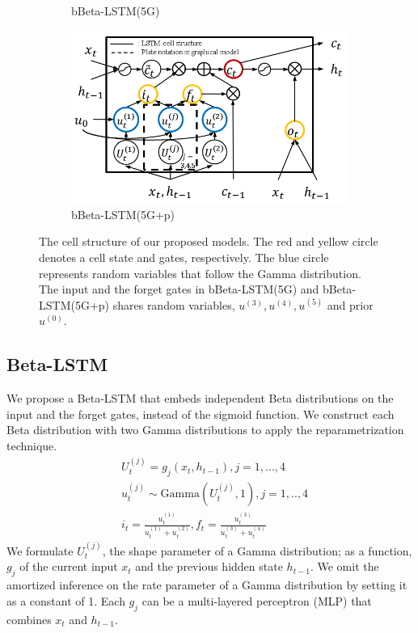 \documentclass[letterpaper]{article} %
\begin{document}
\begin{figure}[t!]
\begin{subfigure}{.48\columnwidth}
		\caption{bBeta-LSTM(5G)} 
	\end{subfigure}\hfil
	\begin{subfigure}{.48\columnwidth}
		\centering
		\includegraphics[width=\linewidth]{bBLSTM_5G_prior_cell.png}
		\caption{bBeta-LSTM(5G+p)}
		\label{fig:bBLSTM(5G)_prior_cell}
	\end{subfigure}
	\caption{The cell structure of our proposed models. The red and yellow circle denotes a cell state and gates, respectively. The blue circle represents random variables that follow the Gamma distribution. The input and the forget gates in bBeta-LSTM(5G) and bBeta-LSTM(5G+p) shares random variables, $u^{(3)},u^{(4)},u^{(5)}$ and prior $u^{(0)}$.}
	\label{fig:our_cell_structure}
\end{figure}
\subsection{Beta-LSTM}
We propose a Beta-LSTM that embeds independent Beta distributions on the input and the forget gates,  instead of the sigmoid function. We construct each Beta distribution with two Gamma distributions to apply the reparametrization technique.
\begin{align}
	&U_{t}^{(j)} = g_{j}(x_{t},h_{t-1}), j=1,...,4 \label{eq:U}\\
	&u_{t}^{(j)} \sim \text{Gamma}(U_{t}^{(j)},1), j=1,..,4 \label{eq:u}\\
	&i_{t} = \frac{u_{t}^{(1)}}{u_{t}^{(1)}+u_{t}^{(2)}}, f_{t} = \frac{u_{t}^{(3)}}{u_{t}^{(3)}+u_{t}^{(4)}}
\end{align}
We formulate $U_{t}^{(j)}$, the shape parameter of a Gamma distribution; as a function, $g_j$ of the current input $x_{t}$ and the previous hidden state $h_{t-1}$. We omit the amortized inference on the rate parameter of a Gamma distribution by setting it as a constant of 1. Each $g_{j}$ can be a multi-layered perceptron (MLP) that combines $x_{t}$ and $h_{t-1}$. 
\end{document}
